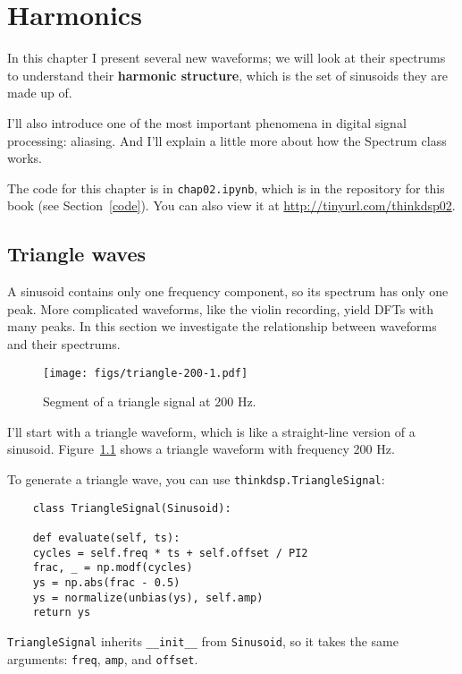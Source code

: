 \chapter{Harmonics}
\label{harmonics}

In this chapter I present several new waveforms; we will look at
their spectrums to understand their {\bf harmonic structure}, which is
the set of sinusoids they are made up of.

I'll also introduce one of the most important phenomena in digital
signal processing: aliasing.  And I'll explain a little more about how
the Spectrum class works.

The code for this chapter is in {\tt chap02.ipynb}, which is in the
repository for this book (see Section~\ref{code}).
You can also view it at \url{http://tinyurl.com/thinkdsp02}.


\section{Triangle waves}
\label{triangle}

A sinusoid contains only one frequency component, so its spectrum
has only one peak.  More complicated waveforms, like the
violin recording, yield DFTs with many peaks.  In this section we
investigate the relationship between waveforms and their spectrums.

\begin{figure}
	\centerline{\texttt{[image: figs/triangle-200-1.pdf]}}
	\caption{Segment of a triangle signal at 200 Hz.}
	\label{fig.triangle.200.1}
\end{figure}

I'll start with a triangle waveform, which is like a straight-line
version of a sinusoid.  Figure~\ref{fig.triangle.200.1} shows a
triangle waveform with frequency 200 Hz.

To generate a triangle wave, you can use {\tt thinkdsp.TriangleSignal}:

\begin{verbatim}
	class TriangleSignal(Sinusoid):
	
	def evaluate(self, ts):
	cycles = self.freq * ts + self.offset / PI2
	frac, _ = np.modf(cycles)
	ys = np.abs(frac - 0.5)
	ys = normalize(unbias(ys), self.amp)
	return ys
\end{verbatim}

{\tt TriangleSignal} inherits \verb"__init__" from {\tt Sinusoid},
so it takes the same arguments: {\tt freq}, {\tt amp}, and {\tt offset}.

